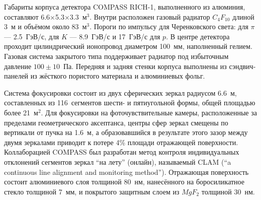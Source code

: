 


Габариты корпуса детектора COMPASS \mbox{RICH-1}, выполненного из алюминия, составляют 6.6$\times$5.3$\times$3.3~м$^3$. Внутри расположен газовый радиатор $C_{4}F_{10}$ длиной 3~м и объёмом около 83~м$^3$. Пороги по импульсу для Черенковского света: для $\pi$ --- 2.5~ГэВ/с, для $K$ --- 8.9~ГэВ/с и 17~ГэВ/с для $p$. В центре детектора проходит цилиндрический ионопровод диаметром 100~мм, наполненный гелием. Газовая система закрытого типа поддерживает радиатор под избыточным давление $100\pm10$~Па. Передняя и задняя стенки корпуса выполнены из сэндвич-панелей из жёсткого пористого материала и алюминиевых фольг.




Система фокусировки состоит из двух сферических зеркал радиусом 6.6~м, составленных из 116~сегментов шести- и пятиугольной формы, общей площадью более 21~м$^2$. Для фокусировки на фоточувствительные камеры, расположенные за пределами геометрического аксептанса, центры сфер зеркал смещены по вертикали от пучка на 1.6~м, а образовавшийся в результате этого зазор между двумя зеркалами приводит к потере 4\% площади отражающей поверхности.
Коллаборацией COMPASS был разработан метод контроля индивидуальных отклонений сегментов зеркал ``на лету'' (онлайн), называемый CLAM (``a continuous line alignment and monitoring method''). Отражающая поверхность состоит алюминиевого слоя толщиной 80~нм, нанесённого на боросиликатное стекло толщиной 7~мм, и покрытого защитным слоем из $MgF_{2}$ толщиной 30~нм.

